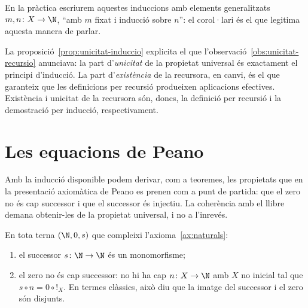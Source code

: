 En la pràctica escriurem aquestes induccions amb elements generalitzats
\(m,n\colon X\to\N\), \enquote{amb \(m\) fixat i inducció sobre \(n\)}: el
corol·lari és el que legitima aquesta manera de parlar.

\begin{observacio}\label{obs:recursio-i-induccio}
La proposició~\ref{prop:unicitat-induccio} explicita el que
l'observació~\ref{obs:unicitat-recursio} anunciava: la part
d'\emph{unicitat} de la propietat universal és exactament el principi
d'inducció. La part d'\emph{existència} de la recursora, en canvi, és el
que garanteix que les definicions per recursió produeixen aplicacions
efectives. Existència i unicitat de la recursora són, doncs, la definició
per recursió i la demostració per inducció, respectivament.
\end{observacio}

\section{Les equacions de Peano}\label{sec:peano}

Amb la inducció disponible podem derivar, com a teoremes, les propietats
que en la presentació axiomàtica de Peano es prenen com a punt de partida:
que el zero no és cap successor i que el successor és injectiu. La
coherència amb el llibre demana obtenir-les de la propietat universal, i
no a l'inrevés.

\begin{teorema}\label{teo:peano}
En tota terna \((\N,0,s)\) que compleixi l'axioma~\ref{ax:naturals}:
\begin{enumerate}
\item el successor \(s\colon\N\to\N\) és un monomorfisme;
\item el zero no és cap successor: no hi ha cap \(n\colon X\to\N\) amb
\(X\) no inicial tal que \(s\circ n=0\circ{!}_X\). En termes clàssics,
això diu que la imatge del successor i el zero són disjunts.
\end{enumerate}
\end{teorema}

